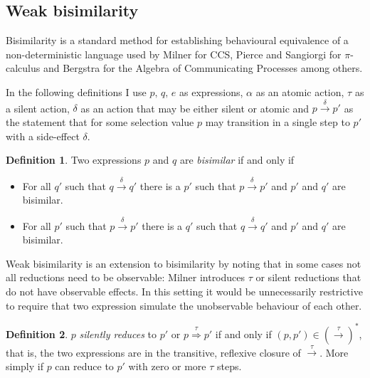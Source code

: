 \documentclass[12pt,twoside,notitlepage]{report}
\theoremstyle{plain}%
\theoremstyle{definition}
\newtheorem{defn}{Definition}[section]
\theoremstyle{remark}
\begin{document}
\subsection{Weak bisimilarity}
Bisimilarity is a standard method for establishing behavioural equivalence of a non-deterministic language used by Milner for CCS\cite{milner1982calculus}, Pierce and Sangiorgi for $ \pi $-calculus\cite{pierce2000behavioral} and Bergstra for the Algebra of Communicating Processes\cite{bergstra1986algebra,bergstra1985algebra} among others. 

In the following definitions I use $ p,\, q,\, e $ as expressions, $ \alpha $ as an atomic action, $ \tau $ as a silent action, $ \delta $ as an action that may be either silent or atomic and $ p \overset{\delta}{\rightarrow} p' $ as the statement that for some selection value $ p $ may transition in a single step to $ p' $ with a side-effect $ \delta $.

\begin{defn}
Two expressions $ p $ and $ q $ are \textit{bisimilar} if and only if
\begin{itemize}
\item{For all $ q' $ such that $ q \overset{\delta}{\rightarrow} q' $ there is a $ p' $ such that $ p \overset{\delta}{\rightarrow} p' $ and $ p' $ and $ q' $ are bisimilar. }
\item{For all $ p' $ such that $ p \overset{\delta}{\rightarrow} p' $ there is a $ q' $ such that $ q \overset{\delta}{\rightarrow} q' $ and $ p' $ and $ q' $ are bisimilar. }
\end{itemize}
\end{defn}

Weak bisimilarity is an extension to bisimilarity by noting that in some cases not all reductions need to be observable: Milner\cite{milner1982calculus} introduces $ \tau $ or silent reductions that do not have observable effects. In this setting it would be unnecessarily restrictive to require that two expression simulate the unobservable behaviour of each other. 

\begin{defn}
$ p $ \textit{silently reduces} to $ p' $ or $ p \overset{\tau}{\Rightarrow} p' $ if and only if $ (p, p') \in \left(\overset{\tau}{\rightarrow}\right)^* $, that is, the two expressions are in the transitive, reflexive closure of $ \overset{\tau}{\rightarrow} $. More simply if $ p $ can reduce to $ p' $ with zero or more $ \tau $ steps.
\end{defn}
\end{document}
